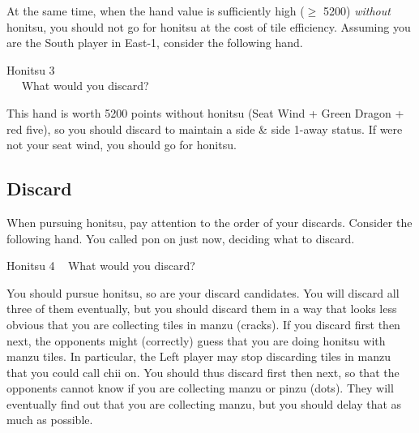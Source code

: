 \bigskip
At the same time, when the hand value is sufficiently high ($\geq$ 5200) \emph{without} {\jap honitsu}, you should not go for {\jap honitsu} at the cost of tile efficiency. Assuming you are the South player in East-1, consider the following hand.
\bigskip
\begin{itembox}[r]{{\jap Honitsu} 3}
\bp \vspace{-10pt}
\\ \vspace{-16pt}
\rfw{}\fa\fa\fa\xi~~\nan\nan\rnan
\ep
\vspace{-10pt}What would you discard? \vspace{-5pt}
\end{itembox}

\bigskip
This hand is worth 5200 points without {\jap honitsu} (Seat Wind + Green Dragon + red five), so you should discard {\LARGE{}} to maintain a side \& side 1-away status. If {\LARGE\nan} were not your seat wind, you should go for {\jap honitsu}.

\bigskip
\subsection{Discard}
When pursuing {\jap honitsu}, pay attention to the order of your discards. 
Consider the following hand. You called {\jap pon} on {\LARGE\bai} just now, deciding what to discard. 
\bigskip
\begin{itembox}[r]{{\jap Honitsu} 4}
\bp
{}\bei\bei\zhong~\bai\bai\rbai
\ep
\vspace{-10pt}What would you discard? \vspace{-5pt}
\end{itembox}

\bigskip
You should pursue {\jap honitsu}, so {\LARGE{}} are your discard candidates. You will discard all three of them eventually, but you should discard them in a way that looks less obvious that you are collecting tiles in {\jap manzu} (cracks). 
If you discard {\LARGE{}} first then {\LARGE{}} next, the opponents might (correctly) guess that you are doing {\jap honitsu} with {\jap manzu} tiles. 
In particular, the Left player may stop discarding tiles in {\jap manzu} that you could call {\jap chii} on. You should thus discard {\LARGE{}} first then {\LARGE{}} next, so that the opponents cannot know if you are collecting {\jap manzu} or {\jap pinzu} (dots). They will eventually find out that you are collecting {\jap manzu}, but you should delay that as much as possible. 

